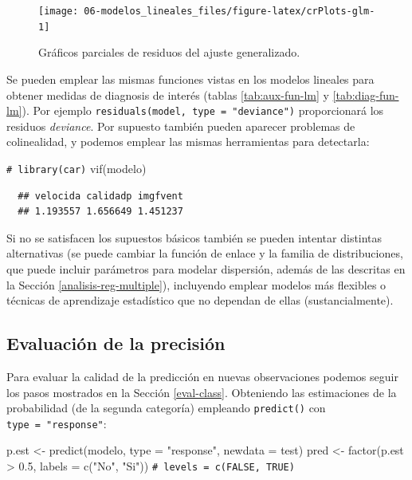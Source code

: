 \documentclass[
]{book}
\newenvironment{Shaded}{\begin{snugshade}}{\end{snugshade}}
\newcommand{\AttributeTok}[1]{\textcolor[rgb]{0.77,0.63,0.00}{#1}}
\newcommand{\CommentTok}[1]{\textcolor[rgb]{0.56,0.35,0.01}{\textit{#1}}}
\newcommand{\FloatTok}[1]{\textcolor[rgb]{0.00,0.00,0.81}{#1}}
\newcommand{\FunctionTok}[1]{\textcolor[rgb]{0.00,0.00,0.00}{#1}}
\newcommand{\NormalTok}[1]{#1}
\newcommand{\OtherTok}[1]{\textcolor[rgb]{0.56,0.35,0.01}{#1}}
\newcommand{\SpecialCharTok}[1]{\textcolor[rgb]{0.00,0.00,0.00}{#1}}
\newcommand{\StringTok}[1]{\textcolor[rgb]{0.31,0.60,0.02}{#1}}
\theoremstyle{break}
\theoremstyle{nonumberplain}
\renewcommand{\CommentTok}[1]{\textcolor[rgb]{0.41,0.41,0.41}{\texttt{#1}}}
\begin{document}
\begin{figure}[!htb]

{\centering \texttt{[image: 06-modelos\_lineales\_files/figure-latex/crPlots-glm-1]} 

}

\caption{Gráficos parciales de residuos del ajuste generalizado.}\label{fig:crPlots-glm}
\end{figure}

Se pueden emplear las mismas funciones vistas en los modelos lineales para obtener medidas de diagnosis de interés (tablas \ref{tab:aux-fun-lm} y \ref{tab:diag-fun-lm}). Por ejemplo \texttt{residuals(model,\ type\ =\ "deviance")} proporcionará los residuos \emph{deviance}.
Por supuesto también pueden aparecer problemas de colinealidad, y podemos emplear las mismas herramientas para detectarla:

\begin{Shaded}
\begin{Highlighting}[]
\CommentTok{\# library(car)}
\FunctionTok{vif}\NormalTok{(modelo)}
\end{Highlighting}
\end{Shaded}

\begin{verbatim}
  ## velocida calidadp imgfvent 
  ## 1.193557 1.656649 1.451237
\end{verbatim}

Si no se satisfacen los supuestos básicos también se pueden intentar distintas alternativas (se puede cambiar la función de enlace y la familia de distribuciones, que puede incluir parámetros para modelar dispersión, además de las descritas en la Sección \ref{analisis-reg-multiple}), incluyendo emplear modelos más flexibles o técnicas de aprendizaje estadístico que no dependan de ellas (sustancialmente).

\hypertarget{evaluaciuxf3n-de-la-precisiuxf3n}{%
\subsection{Evaluación de la precisión}\label{evaluaciuxf3n-de-la-precisiuxf3n}}

Para evaluar la calidad de la predicción en nuevas observaciones podemos seguir los pasos mostrados en la Sección \ref{eval-class}.
Obteniendo las estimaciones de la probabilidad (de la segunda categoría) empleando \texttt{predict()} con \texttt{type\ =\ "response"}:

\begin{Shaded}
\begin{Highlighting}[]
\NormalTok{p.est }\OtherTok{\textless{}{-}} \FunctionTok{predict}\NormalTok{(modelo, }\AttributeTok{type =} \StringTok{"response"}\NormalTok{, }\AttributeTok{newdata =}\NormalTok{ test)}
\NormalTok{pred }\OtherTok{\textless{}{-}} \FunctionTok{factor}\NormalTok{(p.est }\SpecialCharTok{\textgreater{}} \FloatTok{0.5}\NormalTok{, }\AttributeTok{labels =} \FunctionTok{c}\NormalTok{(}\StringTok{"No"}\NormalTok{, }\StringTok{"Si"}\NormalTok{)) }\CommentTok{\# levels = c(\textquotesingle{}FALSE\textquotesingle{}, \textquotesingle{}TRUE\textquotesingle{})}
\end{Highlighting}
\end{Shaded}
\end{document}
